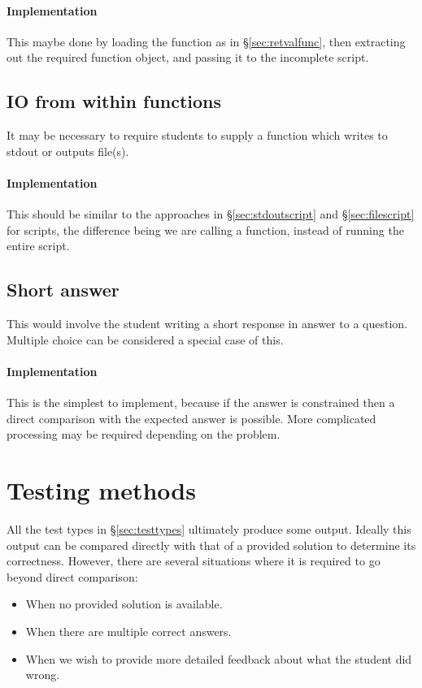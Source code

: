 \paragraph{Implementation} This maybe done by loading the function as in \S\ref{sec:retvalfunc}, then extracting out the required function object, and passing it to the incomplete script.

\subsection{IO from within functions}
It may be necessary to require students to supply a function which writes to stdout or outputs file(s).

\paragraph{Implementation} This should be similar to the approaches in \S\ref{sec:stdoutscript} and \S\ref{sec:filescript} for scripts, the difference being we are calling a function, instead of running the entire script.

\subsection{Short answer}
This would involve the student writing a short response in answer to a question. Multiple choice can be considered a special case of this.

\paragraph{Implementation}
This is the simplest to implement, because if the answer is constrained then a direct comparison with the expected answer is possible. More complicated processing may be required depending on the problem.

\section{Testing methods}
All the test types in \S\ref{sec:testtypes} ultimately produce some output. Ideally this output can be compared directly with that of a provided solution to determine its correctness. However, there are several situations where it is required to go beyond direct comparison:

\begin{itemize}
\item When no provided solution is available.
\item When there are multiple correct answers.
\item When we wish to provide more detailed feedback about what the student did wrong.
\end{itemize}

